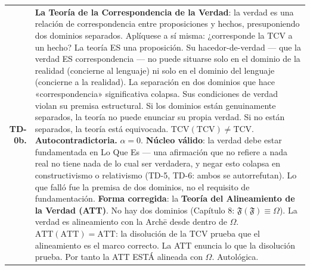 \documentclass[10pt, openany, oneside]{book}
\begin{document}
{\begin{tabular}{r p{}}
\textbf{TD-0b.} & \textbf{La Teoría de la Correspondencia de la Verdad}: la verdad es una relación de correspondencia entre proposiciones y hechos, presuponiendo dos dominios separados. Aplíquese a sí misma: ¿corresponde la TCV a un hecho? La teoría ES una proposición. Su hacedor-de-verdad --- que la verdad ES correspondencia --- no puede situarse solo en el dominio de la realidad (concierne al lenguaje) ni solo en el dominio del lenguaje (concierne a la realidad). La separación en dos dominios que hace «correspondencia» significativa colapsa. Sus condiciones de verdad violan su premisa estructural. Si los dominios están genuinamente separados, la teoría no puede enunciar su propia verdad. Si no están separados, la teoría está equivocada. $\text{TCV}(\text{TCV}) \neq \text{TCV}$. \textbf{Autocontradictoria.} $\alpha = 0$. \textbf{Núcleo válido}: la verdad debe estar fundamentada en Lo Que Es --- una afirmación que no refiere a nada real no tiene nada de lo cual ser verdadera, y negar esto colapsa en constructivismo o relativismo (TD-5, TD-6: ambos se autorrefutan). Lo que falló fue la premisa de dos dominios, no el requisito de fundamentación. \textbf{Forma corregida}: la \textbf{Teoría del Alineamiento de la Verdad (ATT)}. No hay dos dominios (Capítulo 8: $\mathfrak{F}(\mathfrak{F}) \equiv \Omega$). La verdad es alineamiento con la Arch\={e} desde dentro de $\Omega$. $\text{ATT}(\text{ATT}) = \text{ATT}$: la disolución de la TCV prueba que el alineamiento es el marco correcto. La ATT enuncia lo que la disolución prueba. Por tanto la ATT ESTÁ alineada con $\Omega$. Autológica. \\[0.3em]
\end{tabular}
}

\vspace{0.5em}
\end{document}
